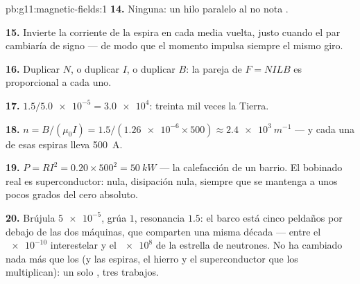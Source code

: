 \begin{solution}{pb:g11:magnetic-fields:1}
\textbf{14.} Ninguna: un hilo paralelo al  no nota .

\textbf{15.} Invierte la corriente de la espira en cada media vuelta,
justo cuando el par cambiaría de signo --- de modo que el momento
impulsa siempre el mismo giro.

\textbf{16.} Duplicar $N$, o duplicar $I$, o duplicar $B$: la pareja de
 $F = NILB$ es proporcional a cada uno.

\textbf{17.} $1.5 / \num{5.0e-5} = \num{3.0e4}$: treinta mil veces la
Tierra.

\textbf{18.} $n = B/(\mu_0 I) = 1.5 / (\num{1.26e-6} \times 500)
\approx \qty{2.4e3}{m^{-1}}$ --- y cada una de esas espiras lleva
\qty{500}{A}.

\textbf{19.} $P = RI^2 = 0.20 \times 500^2 = \qty{50}{kW}$ --- la
calefacción de un barrio. El bobinado real es superconductor:
 nula, disipación nula, siempre que se mantenga a unos pocos
grados del cero absoluto.

\textbf{20.} Brújula $\num{5e-5}$, grúa $1$, resonancia $1.5$: el barco
está cinco peldaños por debajo de las dos máquinas, que comparten una
misma década --- entre el $\num{e-10}$ interestelar y el $\num{e8}$ de
la estrella de neutrones. No ha cambiado nada más que los  (y
las espiras, el hierro y el superconductor que los multiplican): un solo
, tres trabajos.
\end{solution}
